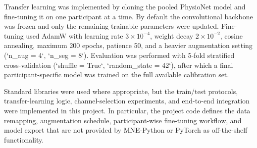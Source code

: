 \documentclass[12pt, a4paper]{article}
\begin{document}
Transfer learning was implemented by cloning the pooled PhysioNet model and fine-tuning it on one participant at a time. By default the convolutional backbone was frozen and only the remaining trainable parameters were updated. Fine-tuning used AdamW with learning rate $3 \times 10^{-4}$, weight decay $2 \times 10^{-2}$, cosine annealing, maximum 200 epochs, patience 50, and a heavier augmentation setting (`n\_aug = 4`, `n\_seg = 8`). Evaluation was performed with 5-fold stratified cross-validation (`shuffle = True`, `random\_state = 42`), after which a final participant-specific model was trained on the full available calibration set.

Standard libraries were used where appropriate, but the train/test protocols, transfer-learning logic, channel-selection experiments, and end-to-end integration were implemented in this project. In particular, the project code defines the data remapping, augmentation schedule, participant-wise fine-tuning workflow, and model export that are not provided by MNE-Python or PyTorch as off-the-shelf functionality.
\end{document}
